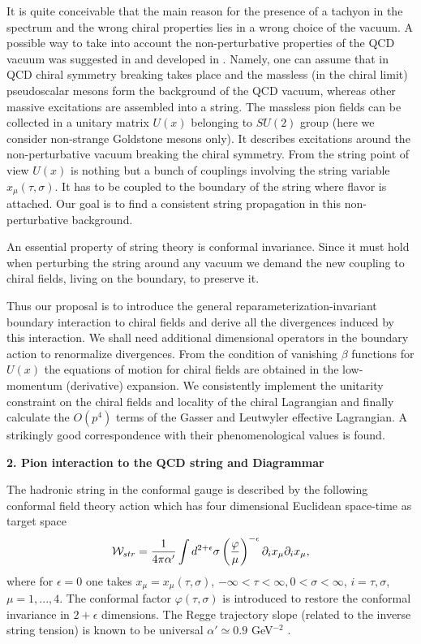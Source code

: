 \documentclass[a4paper,12pt]{article}
\begin{document}
It is quite conceivable that the main reason for the
presence of a tachyon in the spectrum and the wrong chiral
properties lies in a wrong choice
of the vacuum\cite{tachyon}.
A possible way to take into account the non-perturbative properties
 of the QCD vacuum 
was suggested in \cite{ADE} and developed in \cite{aabe}. Namely, one can assume
that in QCD chiral symmetry breaking takes place and
the massless (in the chiral limit) pseudoscalar mesons form the background
of the QCD vacuum,
whereas other massive excitations are assembled into a string.
The massless pion fields can be collected in a
unitary matrix $U(x)$ belonging to $SU(2)$ group (here we 
consider non-strange Goldstone mesons only). It describes excitations
around the non-perturbative vacuum breaking the chiral symmetry. From the 
string point of view
$U(x)$ is nothing but a
bunch of couplings involving the string variable $x_\mu(\tau,\sigma)$. 
It has to be coupled to the
boundary of the string where flavor is attached.
Our goal is to find
a consistent string propagation in this non-perturbative background.

An essential property of string theory is conformal invariance. 
Since it must hold when 
perturbing the string around any vacuum we demand the new coupling to
chiral fields, living on the boundary, to preserve it.

Thus our proposal is to introduce the general reparameterization-invariant
boundary interaction to chiral fields and derive all the divergences induced by
this interaction. We shall need additional dimensional operators
 in the boundary action to renormalize divergences. 
From the condition of vanishing $\beta$ functions for $U(x)$
the equations of motion for chiral fields are obtained in the low-momentum 
(derivative)
expansion. We consistently implement the unitarity constraint on the 
chiral fields 
and locality of the chiral
Lagrangian and finally calculate the $O(p^4)$ terms of 
the Gasser and Leutwyler\cite{GL} 
effective Lagrangian. A strikingly good correspondence
with their phenomenological values is found.\\

\centerline{\large\bf 2. Pion interaction to the QCD string and Diagrammar}

\medskip

The hadronic string in the conformal gauge is described by the following
conformal field theory action which has four dimensional Euclidean
space-time as target space
\begin{equation}
{\cal W}_{str}=\frac{1}{4\pi\alpha'}\int d^{2+\epsilon}\sigma
\left(\frac{\varphi}{\mu}\right)^{-\epsilon} 
\partial_i x_\mu \partial_i x_\mu, 
\label{string}
\end{equation} 
where for $\epsilon = 0$ one takes 
$x_\mu = x_\mu(\tau, \sigma)$, $ 
-\infty <\tau< \infty, 0< \sigma <\infty$,
$i = \tau,\sigma$, $\mu=1,...,4$. 
The conformal factor $\varphi(\tau, \sigma)$ is 
introduced to restore the conformal 
invariance in $2+\epsilon$ dimensions. The Regge trajectory slope
(related to the inverse string tension) is known
to be universal $\alpha' \simeq 0.9$ GeV$^{-2}$ \cite{lia}.
\end{document}
